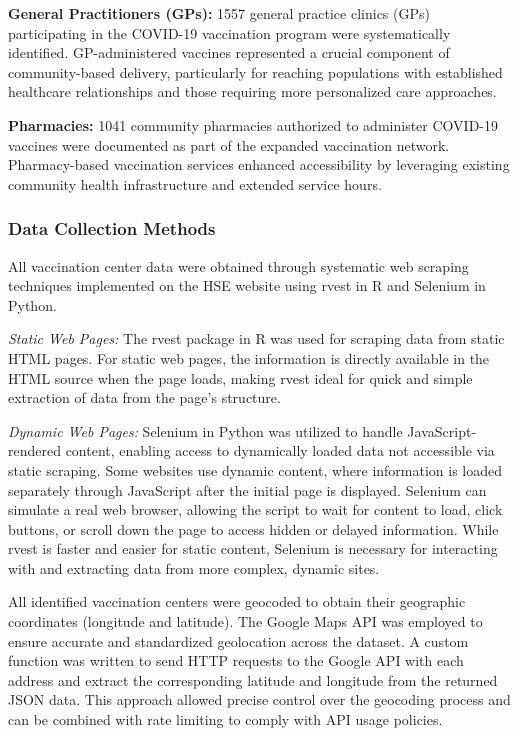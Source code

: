 \documentclass{article}
\begin{document}
\textbf{General Practitioners (GPs):} 1557 general practice clinics
(GPs) participating in the COVID-19 vaccination program were
systematically identified. GP-administered vaccines represented a
crucial component of community-based delivery, particularly for reaching
populations with established healthcare relationships and those
requiring more personalized care approaches.

\textbf{Pharmacies:} 1041 community pharmacies authorized to administer
COVID-19 vaccines were documented as part of the expanded vaccination
network. Pharmacy-based vaccination services enhanced accessibility by
leveraging existing community health infrastructure and extended service
hours.

\subsubsection{Data Collection Methods}\label{data-collection-methods}

All vaccination center data were obtained through systematic web
scraping techniques implemented on the HSE website using rvest in R and
Selenium in Python.

\emph{Static Web Pages:} The rvest package in R was used for scraping
data from static HTML pages. For static web pages, the information is
directly available in the HTML source when the page loads, making rvest
ideal for quick and simple extraction of data from the page's structure.

\emph{Dynamic Web Pages:} Selenium in Python was utilized to handle
JavaScript-rendered content, enabling access to dynamically loaded data
not accessible via static scraping. Some websites use dynamic content,
where information is loaded separately through JavaScript after the
initial page is displayed. Selenium can simulate a real web browser,
allowing the script to wait for content to load, click buttons, or
scroll down the page to access hidden or delayed information. While
rvest is faster and easier for static content, Selenium is necessary for
interacting with and extracting data from more complex, dynamic sites.

All identified vaccination centers were geocoded to obtain their
geographic coordinates (longitude and latitude). The Google Maps API was
employed to ensure accurate and standardized geolocation across the
dataset. A custom function was written to send HTTP requests to the
Google API with each address and extract the corresponding latitude and
longitude from the returned JSON data. This approach allowed precise
control over the geocoding process and can be combined with rate
limiting to comply with API usage policies.
\end{document}
